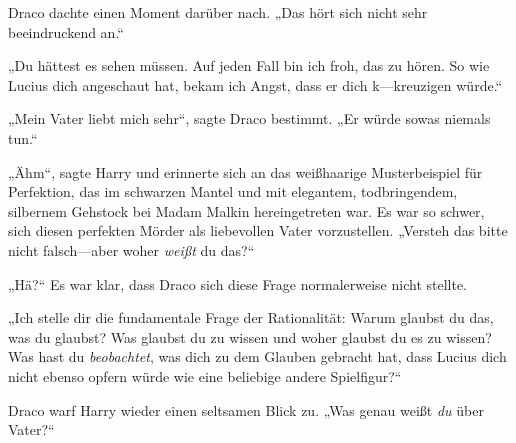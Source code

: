 Draco dachte einen Moment darüber nach. „Das hört sich nicht sehr beeindruckend an.“

„Du hättest es sehen müssen. Auf jeden Fall bin ich froh, das zu hören. So wie Lucius dich angeschaut hat, bekam ich Angst, dass er dich k—kreuzigen würde.“

„Mein Vater liebt mich sehr“, sagte Draco bestimmt. „Er würde sowas niemals tun.“

„Ähm“, sagte Harry und erinnerte sich an das weißhaarige Musterbeispiel für Perfektion, das im schwarzen Mantel und mit elegantem, todbringendem, silbernem Gehstock bei Madam Malkin hereingetreten war. Es war so schwer, sich diesen perfekten Mörder als liebevollen Vater vorzustellen. „Versteh das bitte nicht falsch—aber woher \emph{weißt} du das?“

„Hä?“ Es war klar, dass Draco sich diese Frage normalerweise nicht stellte.

„Ich stelle dir die fundamentale Frage der Rationalität: Warum glaubst du das, was du glaubst? Was glaubst du zu wissen und woher glaubst du es zu wissen? Was hast du \emph{beobachtet}, was dich zu dem Glauben gebracht hat, dass Lucius dich nicht ebenso opfern würde wie eine beliebige andere Spielfigur?“

Draco warf Harry wieder einen seltsamen Blick zu. „Was genau weißt \emph{du} über Vater?“

